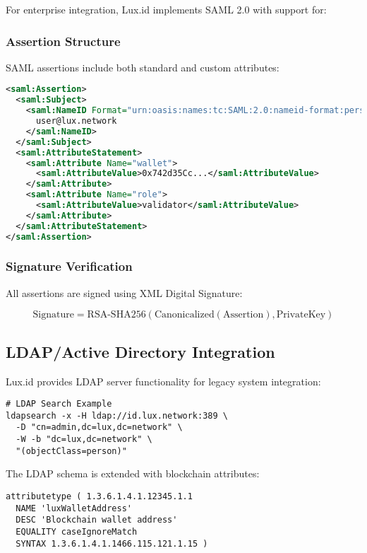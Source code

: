 \documentclass[11pt,a4paper]{article}
\begin{document}
For enterprise integration, Lux.id implements SAML 2.0 with support for:

\subsubsection{Assertion Structure}

SAML assertions include both standard and custom attributes:

\begin{lstlisting}[language=xml]
<saml:Assertion>
  <saml:Subject>
    <saml:NameID Format="urn:oasis:names:tc:SAML:2.0:nameid-format:persistent">
      user@lux.network
    </saml:NameID>
  </saml:Subject>
  <saml:AttributeStatement>
    <saml:Attribute Name="wallet">
      <saml:AttributeValue>0x742d35Cc...</saml:AttributeValue>
    </saml:Attribute>
    <saml:Attribute Name="role">
      <saml:AttributeValue>validator</saml:AttributeValue>
    </saml:Attribute>
  </saml:AttributeStatement>
</saml:Assertion>
\end{lstlisting}

\subsubsection{Signature Verification}

All assertions are signed using XML Digital Signature:

\begin{equation}
    \text{Signature} = \text{RSA-SHA256}(\text{Canonicalized}(\text{Assertion}), \text{PrivateKey})
\end{equation}

\subsection{LDAP/Active Directory Integration}

Lux.id provides LDAP server functionality for legacy system integration:

\begin{lstlisting}
# LDAP Search Example
ldapsearch -x -H ldap://id.lux.network:389 \
  -D "cn=admin,dc=lux,dc=network" \
  -W -b "dc=lux,dc=network" \
  "(objectClass=person)"
\end{lstlisting}

The LDAP schema is extended with blockchain attributes:

\begin{lstlisting}
attributetype ( 1.3.6.1.4.1.12345.1.1
  NAME 'luxWalletAddress'
  DESC 'Blockchain wallet address'
  EQUALITY caseIgnoreMatch
  SYNTAX 1.3.6.1.4.1.1466.115.121.1.15 )
\end{lstlisting}
\end{document}
